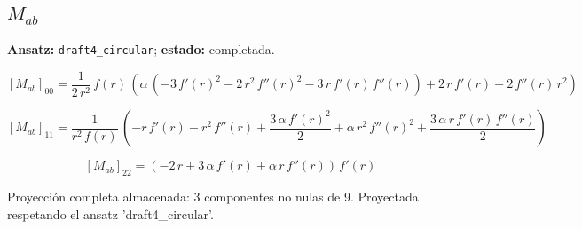 \documentclass[11pt]{article}
\begin{document}
\subsection*{$ M_{ab} $}
\textbf{Ansatz:} \texttt{draft4\_circular}; \textbf{estado:} completada.\par
\begin{dmath*}[breakdepth={5}]
\left[M_{ab}\right]_{00} = \frac{1}{2\,{r}^{2}}\,f\!\left(r\right)\,\left(\alpha\,\left(-3\,{f'\!\left(r\right)}^{2} - 2\,{r}^{2}\,{f''\!\left(r\right)}^{2} - 3\,r\,f'\!\left(r\right)\,f''\!\left(r\right)\right) + 2\,r\,f'\!\left(r\right) + 2\,f''\!\left(r\right)\,{r}^{2}\right)
\end{dmath*}
\par\smallskip
\begin{dmath*}[breakdepth={5}]
\left[M_{ab}\right]_{11} = \frac{1}{{r}^{2}\,f\!\left(r\right)}\,\left(-r\,f'\!\left(r\right) - {r}^{2}\,f''\!\left(r\right) + \frac{3\,\alpha\,{f'\!\left(r\right)}^{2}}{2} + \alpha\,{r}^{2}\,{f''\!\left(r\right)}^{2} + \frac{3\,\alpha\,r\,f'\!\left(r\right)\,f''\!\left(r\right)}{2}\right)
\end{dmath*}
\par\smallskip
\begin{dmath*}[breakdepth={5}]
\left[M_{ab}\right]_{22} = \left(-2\,r + 3\,\alpha\,f'\!\left(r\right) + \alpha\,r\,f''\!\left(r\right)\right)\,f'\!\left(r\right)
\end{dmath*}
\par\smallskip
Proyección completa almacenada: 3 componentes no nulas de 9. Proyectada respetando el ansatz 'draft4\_circular'.\par\medskip
{}
\end{document}
